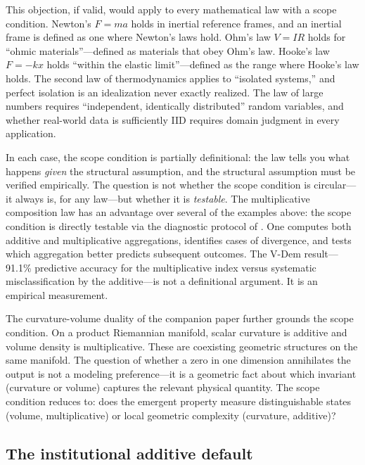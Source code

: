 \documentclass[12pt, a4paper]{article}
\theoremstyle{definition}
\theoremstyle{remark}
\begin{document}
This objection, if valid, would apply to every mathematical law with a scope condition. Newton's $F = ma$ holds in inertial reference frames, and an inertial frame is defined as one where Newton's laws hold. Ohm's law $V = IR$ holds for ``ohmic materials''---defined as materials that obey Ohm's law. Hooke's law $F = -kx$ holds ``within the elastic limit''---defined as the range where Hooke's law holds. The second law of thermodynamics applies to ``isolated systems,'' and perfect isolation is an idealization never exactly realized. The law of large numbers requires ``independent, identically distributed'' random variables, and whether real-world data is sufficiently IID requires domain judgment in every application.

In each case, the scope condition is partially definitional: the law tells you what happens \textit{given} the structural assumption, and the structural assumption must be verified empirically. The question is not whether the scope condition is circular---it always is, for any law---but whether it is \textit{testable}. The multiplicative composition law has an advantage over several of the examples above: the scope condition is directly testable via the diagnostic protocol of \cite{kirsch2026audit}. One computes both additive and multiplicative aggregations, identifies cases of divergence, and tests which aggregation better predicts subsequent outcomes. The V-Dem result---91.1\% predictive accuracy for the multiplicative index versus systematic misclassification by the additive---is not a definitional argument. It is an empirical measurement.

The curvature-volume duality of the companion paper \cite{kirsch2026ig} further grounds the scope condition. On a product Riemannian manifold, scalar curvature is additive and volume density is multiplicative. These are coexisting geometric structures on the same manifold. The question of whether a zero in one dimension annihilates the output is not a modeling preference---it is a geometric fact about which invariant (curvature or volume) captures the relevant physical quantity. The scope condition reduces to: does the emergent property measure distinguishable states (volume, multiplicative) or local geometric complexity (curvature, additive)?


\subsection{The institutional additive default}
\end{document}
